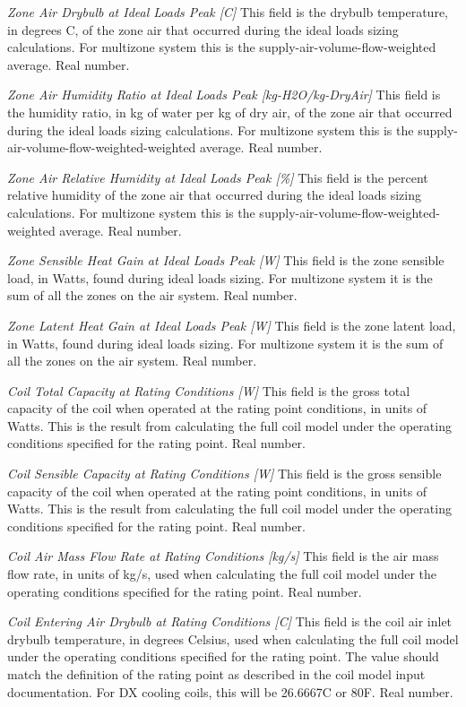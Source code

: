 \emph{Zone Air Drybulb at Ideal Loads Peak [C]}  This field is the drybulb temperature, in degrees C, of the zone air that occurred during the ideal loads sizing calculations. For multizone system this is the supply-air-volume-flow-weighted average. Real number.

\emph{Zone Air Humidity Ratio at Ideal Loads Peak [kg-H2O/kg-DryAir]}  This field is the humidity ratio, in kg of water per kg of dry air, of the zone air that occurred during the ideal loads sizing calculations. For multizone system this is the supply-air-volume-flow-weighted-weighted average. Real number.

\emph{Zone Air Relative Humidity at Ideal Loads Peak [\%]}  This field is the percent relative humidity of the zone air that occurred during the ideal loads sizing calculations. For multizone system this is the supply-air-volume-flow-weighted-weighted average. Real number.

\emph{Zone Sensible Heat Gain at Ideal Loads Peak [W]}  This field is the zone sensible load, in Watts, found during ideal loads sizing.  For multizone system it is the sum of all the zones on the air system. Real number.

\emph{Zone Latent Heat Gain at Ideal Loads Peak [W]}  This field is the zone latent load, in Watts, found during ideal loads sizing.  For multizone system it is the sum of all the zones on the air system. Real number.

\emph{Coil Total Capacity at Rating Conditions [W]}  This field is the gross total capacity of the coil when operated at the rating point conditions, in units of Watts.  This is the result from calculating the full coil model under the operating conditions specified for the rating point.  Real number.

\emph{Coil Sensible Capacity at Rating Conditions [W]}  This field is the gross sensible capacity of the coil when operated at the rating point conditions, in units of Watts.  This is the result from calculating the full coil model under the operating conditions specified for the rating point.  Real number.

\emph{Coil Air Mass Flow Rate at Rating Conditions [kg/s]}  This field is the air mass flow rate, in units of kg/s, used when calculating the full coil model under the operating conditions specified for the rating point.  Real number.

\emph{Coil Entering Air Drybulb at Rating Conditions [C]}  This field is the coil air inlet drybulb temperature, in degrees Celsius, used when calculating the full coil model under the operating conditions specified for the rating point.  The value should match the definition of the rating point as described in the coil model input documentation.  For DX cooling coils, this will be 26.6667C or 80F.  Real number.

